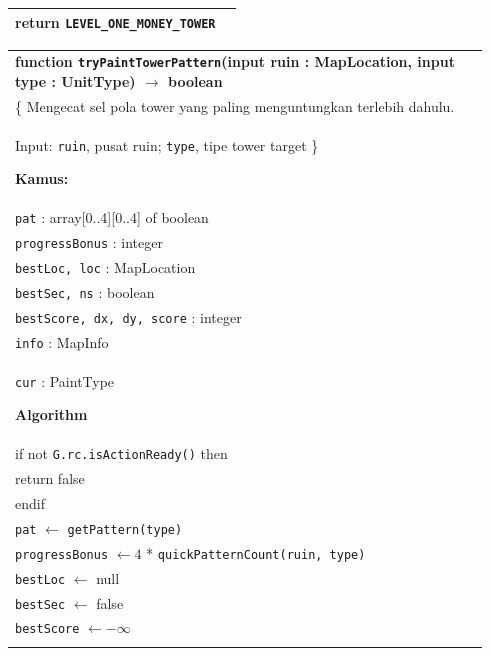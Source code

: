 \documentclass{article}
\newenvironment{pseudobox}
{
\centering
\begin{longtable}{|p{0.94\linewidth}|}
\hline
}
{
\\ \hline
\end{longtable}
\vspace{0.05cm}
}
\begin{document}
\begin{enumerate}[label=\alph*.]
\begin{enumerate}[label=\alph*.]
\begin{pseudobox}
\hspace*{1.5em}return \texttt{LEVEL\_ONE\_MONEY\_TOWER}
\end{pseudobox}

\begin{pseudobox}
\textbf{function \texttt{tryPaintTowerPattern}(input ruin : MapLocation, input type : UnitType) $\rightarrow$ boolean} \\
\{ Mengecat sel pola tower yang paling menguntungkan terlebih dahulu. \\
Input: \texttt{ruin}, pusat ruin; \texttt{type}, tipe tower target
\}

\textbf{Kamus:} \\
\hspace*{1.5em}\texttt{pat} : array[0..4][0..4] of boolean \\
\hspace*{1.5em}\texttt{progressBonus} : integer \\
\hspace*{1.5em}\texttt{bestLoc, loc} : MapLocation \\
\hspace*{1.5em}\texttt{bestSec, ns} : boolean \\
\hspace*{1.5em}\texttt{bestScore, dx, dy, score} : integer \\
\hspace*{1.5em}\texttt{info} : MapInfo \\
\hspace*{1.5em}\texttt{cur} : PaintType

\textbf{Algorithm} \\
\hspace*{1.5em}if not \texttt{G.rc.isActionReady()} then \\
\hspace*{3em}return false \\
\hspace*{1.5em}endif \\

\hspace*{1.5em}\texttt{pat} $\leftarrow$ \texttt{getPattern(type)} \\
\hspace*{1.5em}\texttt{progressBonus} $\leftarrow 4$ * \texttt{quickPatternCount(ruin, type)} \\

\hspace*{1.5em}\texttt{bestLoc} $\leftarrow$ null \\
\hspace*{1.5em}\texttt{bestSec} $\leftarrow$ false \\
\hspace*{1.5em}\texttt{bestScore} $\leftarrow -\infty$ \\


\end{pseudobox}
\end{enumerate}
\end{enumerate}
\end{document}
